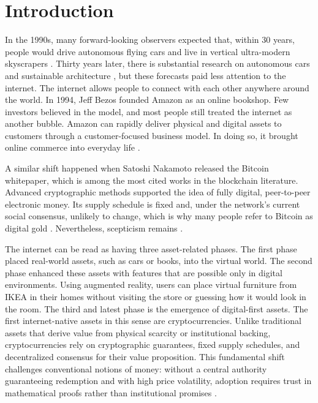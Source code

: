 \section{Introduction}

In the 1990s, many forward-looking observers expected that, within 30 years, people would drive autonomous flying cars and live in vertical ultra-modern skyscrapers \cite{Mcrae1994, Berry1996}.
Thirty years later, there is substantial research on autonomous cars \cite{Faisal2019} and sustainable architecture \cite{Sassi2006}, but these forecasts paid less attention to the internet.
The internet allows people to connect with each other anywhere around the world.
In 1994, Jeff Bezos founded Amazon as an online bookshop. Few investors believed in the model, and most people still treated the internet as another bubble.
Amazon can rapidly deliver physical and digital assets to customers through a customer-focused business model. In doing so, it brought online commerce into everyday life \cite{Mellahi2000, Kotha1998}.

A similar shift happened when Satoshi Nakamoto released the Bitcoin whitepaper, which is among the most cited works in the blockchain literature.
Advanced cryptographic methods supported the idea of fully digital, peer-to-peer electronic money. Its supply schedule is fixed and, under the network's current social consensus, unlikely to change, which is why many people refer to Bitcoin as digital gold \cite{Taskinsoy2021, Uddin2020}. Nevertheless, scepticism remains \cite{Nakamoto}.

The internet can be read as having three asset-related phases.
The first phase placed real-world assets, such as cars or books, into the virtual world.
The second phase enhanced these assets with features that are possible only in digital environments.
Using augmented reality, users can place virtual furniture from IKEA in their homes without visiting the store or guessing how it would look in the room.
The third and latest phase is the emergence of digital-first assets. The first internet-native assets in this sense are cryptocurrencies. Unlike traditional assets that derive value from physical scarcity or institutional backing, cryptocurrencies rely on cryptographic guarantees, fixed supply schedules, and decentralized consensus for their value proposition. This fundamental shift challenges conventional notions of money: without a central authority guaranteeing redemption and with high price volatility, adoption requires trust in mathematical proofs rather than institutional promises \cite{Taskinsoy2021}.

